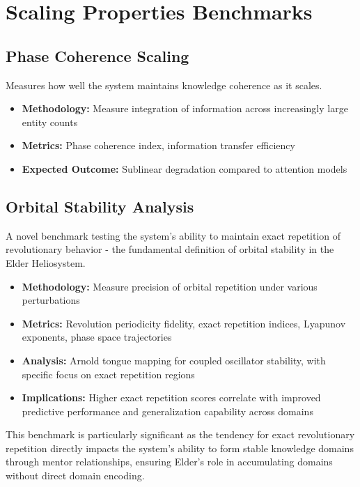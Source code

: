 \section{Scaling Properties Benchmarks}

\subsection{Phase Coherence Scaling}

Measures how well the system maintains knowledge coherence as it scales.

\begin{itemize}
    \item \textbf{Methodology:} Measure integration of information across increasingly large entity counts
    \item \textbf{Metrics:} Phase coherence index, information transfer efficiency
    \item \textbf{Expected Outcome:} Sublinear degradation compared to attention models
\end{itemize}

\subsection{Orbital Stability Analysis}

A novel benchmark testing the system's ability to maintain exact repetition of revolutionary behavior - the fundamental definition of orbital stability in the Elder Heliosystem.

\begin{itemize}
    \item \textbf{Methodology:} Measure precision of orbital repetition under various perturbations
    \item \textbf{Metrics:} Revolution periodicity fidelity, exact repetition indices, Lyapunov exponents, phase space trajectories 
    \item \textbf{Analysis:} Arnold tongue mapping for coupled oscillator stability, with specific focus on exact repetition regions
    \item \textbf{Implications:} Higher exact repetition scores correlate with improved predictive performance and generalization capability across domains
\end{itemize}

This benchmark is particularly significant as the tendency for exact revolutionary repetition directly impacts the system's ability to form stable knowledge domains through mentor relationships, ensuring Elder's role in accumulating domains without direct domain encoding.

